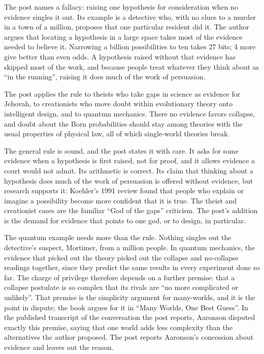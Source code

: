 \begin{afterword}
\summaryhead

The post names a fallacy: raising one hypothesis for consideration when no evidence singles it out. Its example is a detective who, with no clues to a murder in a town of a million, proposes that one particular resident did it. The author argues that locating a hypothesis in a large space takes most of the evidence needed to believe it. Narrowing a billion possibilities to ten takes 27 bits; 4 more give better than even odds. A hypothesis raised without that evidence has skipped most of the work, and because people treat whatever they think about as ``in the running'', raising it does much of the work of persuasion.

The post applies the rule to theists who take gaps in science as evidence for Jehovah, to creationists who move doubt within evolutionary theory onto intelligent design, and to quantum mechanics. There no evidence favors collapse, and doubt about the Born probabilities should stay among theories with the usual properties of physical law, all of which single-world theories break.

\responsehead

The general rule is sound, and the post states it with care. It asks for some evidence when a hypothesis is first raised, not for proof, and it allows evidence a court would not admit. Its arithmetic is correct. Its claim that thinking about a hypothesis does much of the work of persuasion is offered without evidence, but research supports it: Koehler's 1991 review found that people who explain or imagine a possibility become more confident that it is true. The theist and creationist cases are the familiar ``God of the gaps'' criticism. The post's addition is the demand for evidence that points to one god, or to design, in particular.

The quantum example needs more than the rule. Nothing singles out the detective's suspect, Mortimer, from a million people. In quantum mechanics, the evidence that picked out the theory picked out the collapse and no-collapse readings together, since they predict the same results in every experiment done so far. The charge of privilege therefore depends on a further premise: that a collapse postulate is so complex that its rivals are ``no more complicated or unlikely''. That premise is the simplicity argument for many-worlds, and it is the point in dispute; the book argues for it in ``Many Worlds, One Best Guess''. In the published transcript of the conversation the post reports, Aaronson disputed exactly this premise, saying that one world adds less complexity than the alternatives the author proposed. The post reports Aaronson's concession about evidence and leaves out the reason.


\end{afterword}
